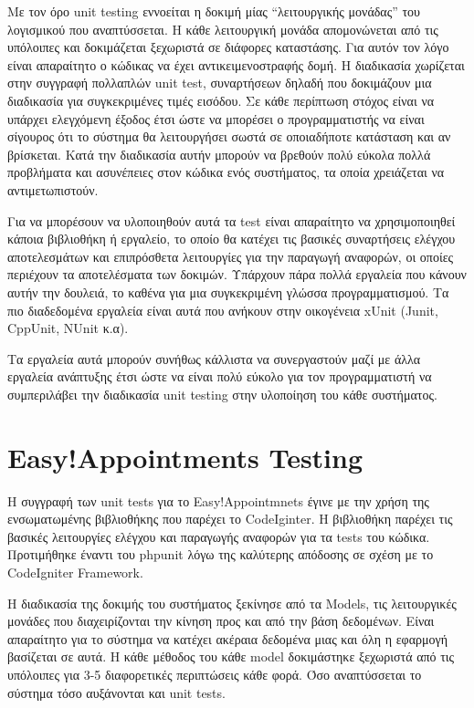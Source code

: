Με τον όρο unit testing εννοείται η δοκιμή μίας “λειτουργικής μονάδας” του λογισμικού που αναπτύσσεται. Η κάθε λειτουργική μονάδα απομονώνεται από τις υπόλοιπες και δοκιμάζεται ξεχωριστά σε διάφορες καταστάσης. Για αυτόν τον λόγο είναι απαραίτητο ο κώδικας να έχει αντικειμενοστραφής δομή. Η διαδικασία χωρίζεται στην συγγραφή πολλαπλών unit test, συναρτήσεων δηλαδή που δοκιμάζουν μια διαδικασία για συγκεκριμένες τιμές εισόδου. Σε κάθε περίπτωση στόχος είναι να υπάρχει ελεγχόμενη έξοδος έτσι ώστε να μπορέσει ο προγραμματιστής να είναι σίγουρος ότι το σύστημα θα λειτουργήσει σωστά σε οποιαδήποτε κατάσταση και αν βρίσκεται. Κατά την διαδικασία αυτήν μπορούν να βρεθούν πολύ εύκολα πολλά προβλήματα και ασυνέπειες στον κώδικα ενός συστήματος, τα οποία χρειάζεται να αντιμετωπιστούν. 

Για να μπορέσουν να υλοποιηθούν αυτά τα test είναι απαραίτητο να χρησιμοποιηθεί κάποια βιβλιοθήκη ή εργαλείο, το οποίο θα κατέχει τις βασικές συναρτήσεις ελέγχου αποτελεσμάτων και επιπρόσθετα λειτουργίες για την παραγωγή αναφορών, οι οποίες περιέχουν τα αποτελέσματα των δοκιμών. Υπάρχουν πάρα πολλά εργαλεία που κάνουν αυτήν την δουλειά, το καθένα για μια συγκεκριμένη γλώσσα προγραμματισμού. Τα πιο διαδεδομένα εργαλεία είναι αυτά που ανήκουν στην οικογένεια xUnit (Junit, CppUnit, NUnit κ.α).

Τα εργαλεία αυτά μπορούν συνήθως κάλλιστα να συνεργαστούν μαζί με άλλα εργαλεία ανάπτυξης έτσι ώστε να είναι πολύ εύκολο για τον προγραμματιστή να συμπεριλάβει την διαδικασία unit testing στην υλοποίηση του κάθε συστήματος.

\section {Easy!Appointments Testing}
Η συγγραφή των unit tests για το Easy!Appointmnets έγινε με την χρήση της ενσωματωμένης βιβλιοθήκης που παρέχει το CodeIginter. Η βιβλιοθήκη παρέχει τις βασικές λειτουργίες ελέγχου και παραγωγής αναφορών για τα tests του κώδικα. Προτιμήθηκε έναντι του phpunit λόγω της καλύτερης απόδοσης σε σχέση με το CodeIgniter Framework. 

Η διαδικασία της δοκιμής του συστήματος ξεκίνησε από τα Models, τις λειτουργικές μονάδες που διαχειρίζονται την κίνηση προς και από την βάση δεδομένων. Είναι απαραίτητο για το σύστημα να κατέχει ακέραια δεδομένα μιας και όλη η εφαρμογή βασίζεται σε αυτά. Η κάθε μέθοδος του κάθε model δοκιμάστηκε ξεχωριστά από τις υπόλοιπες για 3-5 διαφορετικές περιπτώσεις κάθε φορά. Όσο αναπτύσσεται το σύστημα τόσο αυξάνονται και unit tests. 

